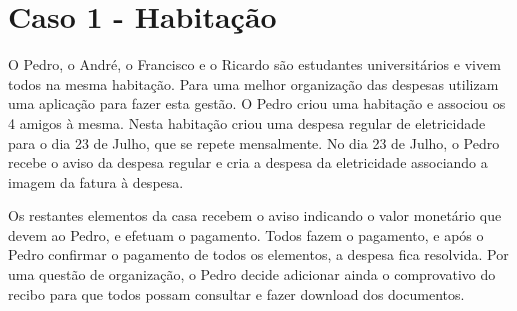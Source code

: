 \section{Caso 1 - Habitação}

O Pedro, o André, o Francisco e o Ricardo são estudantes universitários e vivem todos na mesma habitação. Para uma melhor organização das despesas utilizam uma aplicação para fazer esta gestão. O Pedro criou uma habitação e associou os 4 amigos à mesma. Nesta habitação criou uma despesa regular de eletricidade para o dia 23 de Julho, que se repete mensalmente. No dia 23 de Julho, o Pedro recebe o aviso da despesa regular e cria a despesa da eletricidade associando a imagem da fatura à despesa.

Os restantes elementos da casa recebem o aviso indicando o valor monetário que devem ao Pedro, e efetuam o pagamento. Todos fazem o pagamento, e após o Pedro confirmar o pagamento de todos os elementos, a despesa fica resolvida. Por uma questão de organização, o Pedro decide adicionar ainda o comprovativo do recibo para que todos possam consultar e fazer download dos documentos.